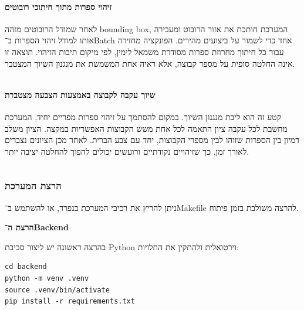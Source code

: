 \begin{english}
  \inputminted{python}{build/snippets/core_loop.py}
\end{english}

\paragraph{זיהוי ספרות מתוך חיתוכי רובוטים}

לאחר שמודל הרובוטים מזהה \textenglish{bounding box}, המערכת חותכת את
אזור הרובוט ומעבירה אותו למודל זיהוי הספרות ב־\textenglish{Batch} אחד
כדי לשמור על ביצועים מהירים. הפונקציה מחזירה עבור כל חיתוך מחרוזת
ספרות מסודרת משמאל לימין, לפי מיקום תיבות הזיהוי. תוצאה זו אינה החלטה
סופית על מספר קבוצה, אלא ראיה אחת המשמשת את מנגנון השיוך המצטבר.

\begin{english}
  \inputminted{python}{build/snippets/digit_detection.py}
\end{english}

\paragraph{שיוך עקבה לקבוצה באמצעות הצבעה מצטברת}

קטע זה הוא ליבת מנגנון השיוך. במקום להסתמך על זיהוי ספרות מפריים יחיד,
המערכת מחשבת לכל עקבה ציון התאמה לכל אחת משש הקבוצות האפשריות במקצה.
הציון משלב דמיון בין הספרות שזוהו לבין מספרי הקבוצות, יחד עם צבע
הברית. לאחר מכן הציונים נצברים לאורך זמן, כך שזיהויים נקודתיים ורועשים
יכולים להפוך להחלטה יציבה יותר.

\begin{english}
  \inputminted{python}{build/snippets/voting_system.py}
\end{english}

\subsubsection{הרצת המערכת}

ניתן להריץ את רכיבי המערכת בנפרד, או להשתמש ב־\textenglish{Makefile}
להרצה משולבת בזמן פיתוח.

\noindent\textbf{הרצת ה־Backend}

בהרצה ראשונה יש ליצור סביבת \textenglish{Python} וירטואלית ולהתקין את
התלויות:

\begin{english}
\begin{verbatim}
cd backend
python -m venv .venv
source .venv/bin/activate
pip install -r requirements.txt
\end{verbatim}
\end{english}

